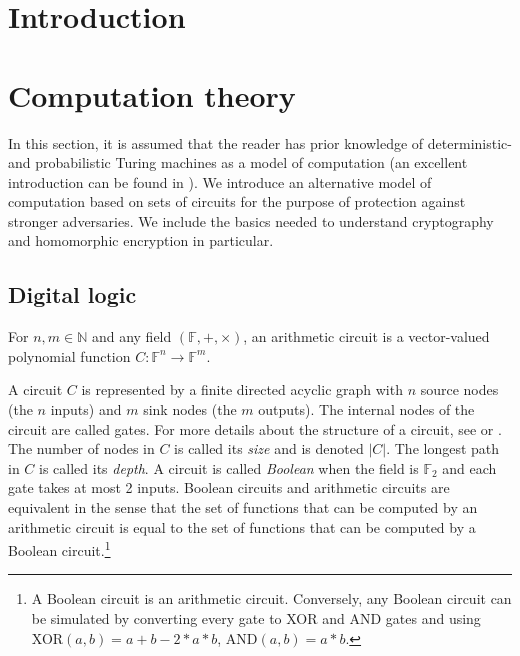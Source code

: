 \chapter{Introduction}


\chapter{Computation theory}
 In this section, it is assumed that the reader has prior knowledge of deterministic- and probabilistic Turing machines as a model of computation (an excellent introduction can be found in \cite{Gol01}). We introduce an alternative model of computation based on sets of circuits for the purpose of protection against stronger adversaries. We include the basics needed to understand cryptography and homomorphic encryption in particular. 

\section{Digital logic}

\begin{definition}[Circuit]
For $n, m \in \mathbb{N}$ and any field $(\mathbb{F},+,\times)$, an arithmetic circuit is a vector-valued polynomial function $C \colon \mathbb{F}^{n} \to \mathbb{F}^m$. 
\end{definition}

A circuit $C$ is represented by a finite directed acyclic graph with $n$ source nodes (the $n$ inputs) and $m$ sink nodes (the $m$ outputs). The internal nodes of the circuit are called gates. For more details about the structure of a circuit, see \cite{goldreich_2008} or \cite{MF21}. The number of nodes in $C$ is called its \emph{size} and is denoted $|C|$. The longest path in $C$ is called its \emph{depth}.
A circuit is called \emph{Boolean} when the field is $\mathbb{F}_2$ and each gate takes at most 2 inputs. Boolean circuits and arithmetic circuits are equivalent in the sense that the set of functions that can be computed by an arithmetic circuit is equal to the set of functions that can be computed by a Boolean circuit.\footnote{A Boolean circuit is an arithmetic circuit. Conversely, any Boolean circuit can be simulated by converting every gate to XOR and AND gates and using XOR$(a,b) = a+b-2*a*b$, AND$(a,b) = a*b$.} 

